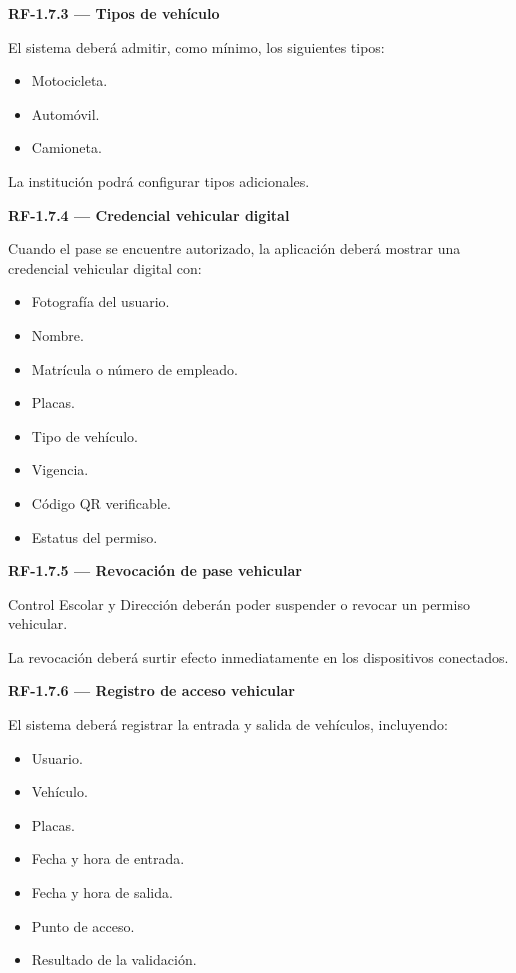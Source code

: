 \documentclass[12pt,a4paper]{article}
\newcommand{\RF}[1]{\textbf{\color{primary}RF-#1}}
\newenvironment{requisito}[1]
{
\begin{center}
\begin{minipage}{0.96\textwidth}
\colorbox{requirement}{
\begin{minipage}{0.94\textwidth}
\textbf{#1}
\end{minipage}
}
\vspace{2mm}
}
{
\end{minipage}
\end{center}
}
\begin{document}
\begin{requisito}{\RF{1.7.3} --- Tipos de vehículo}
El sistema deberá admitir, como mínimo, los siguientes tipos:

\begin{itemize}[leftmargin=*]
\item Motocicleta.
\item Automóvil.
\item Camioneta.
\end{itemize}

La institución podrá configurar tipos adicionales.
\end{requisito}

\begin{requisito}{\RF{1.7.4} --- Credencial vehicular digital}
Cuando el pase se encuentre autorizado, la aplicación deberá mostrar una
credencial vehicular digital con:

\begin{itemize}[leftmargin=*]
\item Fotografía del usuario.
\item Nombre.
\item Matrícula o número de empleado.
\item Placas.
\item Tipo de vehículo.
\item Vigencia.
\item Código QR verificable.
\item Estatus del permiso.
\end{itemize}
\end{requisito}

\begin{requisito}{\RF{1.7.5} --- Revocación de pase vehicular}
Control Escolar y Dirección deberán poder suspender o revocar un permiso
vehicular.

La revocación deberá surtir efecto inmediatamente en los dispositivos conectados.
\end{requisito}

\begin{requisito}{\RF{1.7.6} --- Registro de acceso vehicular}
El sistema deberá registrar la entrada y salida de vehículos, incluyendo:

\begin{itemize}[leftmargin=*]
\item Usuario.
\item Vehículo.
\item Placas.
\item Fecha y hora de entrada.
\item Fecha y hora de salida.
\item Punto de acceso.
\item Resultado de la validación.
\end{itemize}
\end{requisito}
\end{document}
